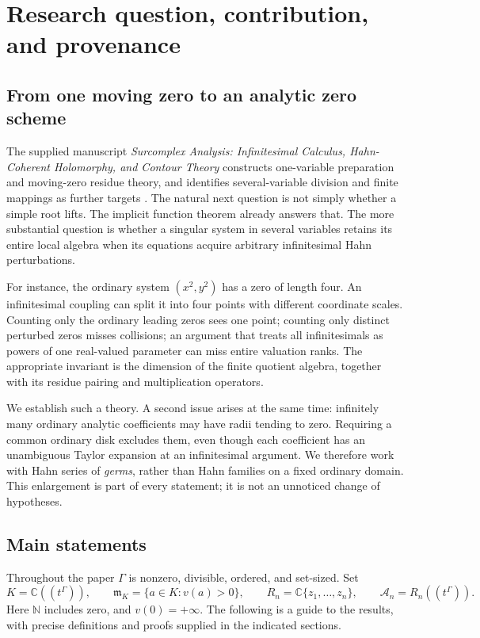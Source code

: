 \documentclass[11pt,letterpaper]{article}
\theoremstyle{definition}
\theoremstyle{remark}
\newcommand{\C}{\mathbb C}
\newcommand{\N}{\mathbb N}
\newcommand{\A}{\mathscr A}
\newcommand{\m}{\mathfrak m}
\numberwithin{equation}{section}
\begin{document}
\section{Research question, contribution, and provenance}\label{sec:intro}

\subsection{From one moving zero to an analytic zero scheme}
The supplied manuscript \emph{Surcomplex Analysis: Infinitesimal Calculus, Hahn-Coherent Holomorphy, and Contour Theory} constructs one-variable preparation and moving-zero residue theory, and identifies several-variable division and finite mappings as further targets \cite{Companion}. The natural next question is not simply whether a simple root lifts. The implicit function theorem already answers that. The more substantial question is whether a singular system in several variables retains its entire local algebra when its equations acquire arbitrary infinitesimal Hahn perturbations.

For instance, the ordinary system $(x^2,y^2)$ has a zero of length four. An infinitesimal coupling can split it into four points with different coordinate scales. Counting only the ordinary leading zeros sees one point; counting only distinct perturbed zeros misses collisions; an argument that treats all infinitesimals as powers of one real-valued parameter can miss entire valuation ranks. The appropriate invariant is the dimension of the finite quotient algebra, together with its residue pairing and multiplication operators.

We establish such a theory. A second issue arises at the same time: infinitely many ordinary analytic coefficients may have radii tending to zero. Requiring a common ordinary disk excludes them, even though each coefficient has an unambiguous Taylor expansion at an infinitesimal argument. We therefore work with Hahn series of \emph{germs}, rather than Hahn families on a fixed ordinary domain. This enlargement is part of every statement; it is not an unnoticed change of hypotheses.

\subsection{Main statements}
Throughout the paper $\Gamma$ is nonzero, divisible, ordered, and set-sized. Set
\[
 K=\C((t^\Gamma)),\qquad
 \m_K=\{a\in K:v(a)>0\},\qquad
 R_n=\C\{z_1,\ldots,z_n\},\qquad
 \A_n=R_n((t^\Gamma)).
\]
Here $\N$ includes zero, and $v(0)=+\infty$. The following is a guide to the results, with precise definitions and proofs supplied in the indicated sections.
\end{document}

